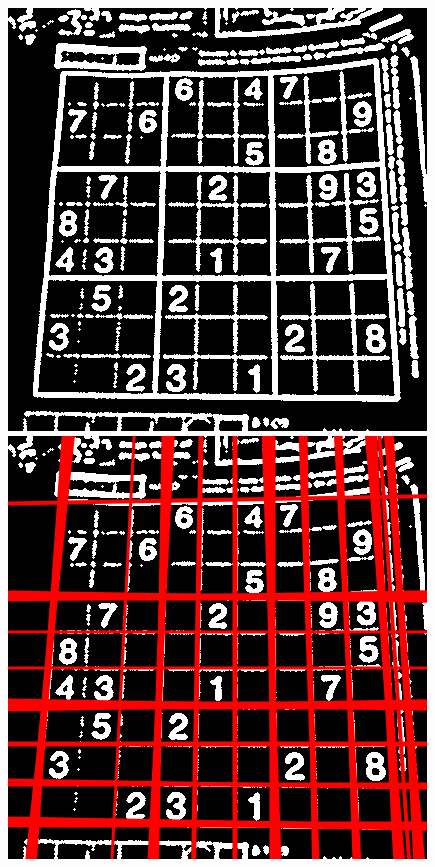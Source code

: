 \begin{figure}
  \centering

  \begin{minipage}[c]{.475\linewidth}
      {
        \includegraphics[width=\textwidth]{img/sht/input.jpeg}
      }
      {
        \includegraphics[width=\textwidth,trim=0 0 0 -1cm ]{img/sht/output.png}
}
\end{minipage}
\end{figure}
